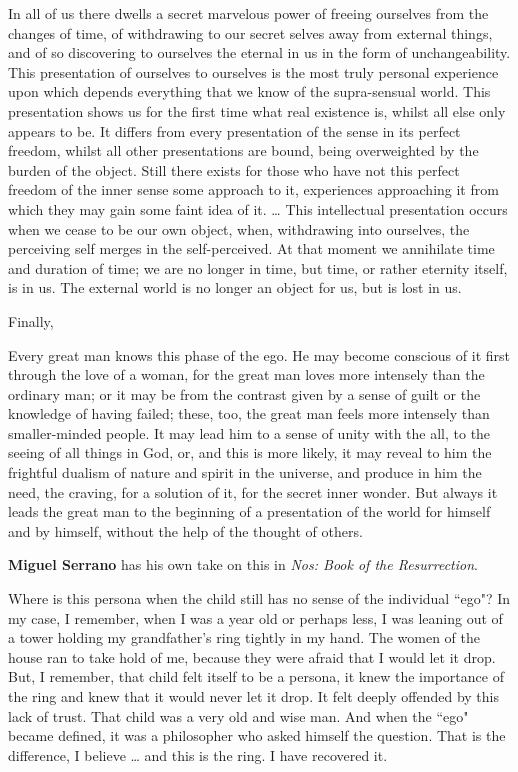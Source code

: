 \begin{quotex}
In all of us there dwells a secret marvelous power of freeing ourselves from the changes of time, of withdrawing to our secret selves away from external things, and of so discovering to ourselves the eternal in us in the form of unchangeability. This presentation of ourselves to ourselves is the most truly personal experience upon which depends everything that we know of the supra-sensual world. This presentation shows us for the first time what real existence is, whilst all else only appears to be. It differs from every presentation of the sense in its perfect freedom, whilst all other presentations are bound, being overweighted by the burden of the object. Still there exists for those who have not this perfect freedom of the inner sense some approach to it, experiences approaching it from which they may gain some faint idea of it. … This intellectual presentation occurs when we cease to be our own object, when, withdrawing into ourselves, the perceiving self merges in the self-perceived. At that moment we annihilate time and duration of time; we are no longer in time, but time, or rather eternity itself, is in us. The external world is no longer an object for us, but is lost in us. 

\end{quotex}
Finally,

\begin{quotex}
Every great man knows this phase of the ego. He may become conscious of it first through the love of a woman, for the great man loves more intensely than the ordinary man; or it may be from the contrast given by a sense of guilt or the knowledge of having failed; these, too, the great man feels more intensely than smaller-minded people. It may lead him to a sense of unity with the all, to the seeing of all things in God, or, and this is more likely, it may reveal to him the frightful dualism of nature and spirit in the universe, and produce in him the need, the craving, for a solution of it, for the secret inner wonder. But always it leads the great man to the beginning of a presentation of the world for himself and by himself, without the help of the thought of others. 

\end{quotex}
\textbf{Miguel Serrano} has his own take on this in \emph{Nos: Book of the Resurrection}.

\begin{quotex}
Where is this persona when the child still has no sense of the individual ``ego"? In my case, I remember, when I was a year old or perhaps less, I was leaning out of a tower holding my grandfather's ring tightly in my hand. The women of the house ran to take hold of me, because they were afraid that I would let it drop. But, I remember, that child felt itself to be a persona, it knew the importance of the ring and knew that it would never let it drop. It felt deeply offended by this lack of trust. That child was a very old and wise man. And when the ``ego" became defined, it was a philosopher who asked himself the question. That is the difference, I believe … and this is the ring. I have recovered it. 

\end{quotex}


